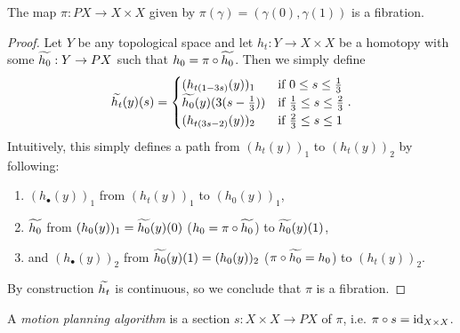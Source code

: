 \begin{remark}
    The map $\pi : PX \to X \times X$ given by $\pi(\gamma) = (\gamma(0), \gamma(1))$ is a fibration.
    \begin{proof}
        Let $Y$ be any topological space and let $h_t : Y \to X \times X$ be a homotopy with some $\Tilde{h_0} : Y \to PX$ such that $h_0 = \pi \circ \Tilde{h_0}$.
        Then we simply define
        \[
            \Tilde{h_t}(y)(s) =
            \begin{cases}
                (h_{t(1-3s)}(y))_1           &\text{if } 0 \leq s \leq \f13 \\
                \Tilde{h_0}(y)(3(s - \f{1}{3}))   &\text{if } \f13 \leq s \leq \f23 \\
                (h_{t(3s-2)}(y))_2           &\text{if } \f23 \leq s \leq 1
            \end{cases}.
        \]
        Intuitively, this simply defines a path from $(h_t(y))_1$ to $(h_t(y))_2$ by following:
        \begin{enumerate}
            \item $(h_\bullet(y))_1$ from $(h_t(y))_1$ to $(h_0(y))_1$,
            \item $\Tilde{h_0}$ from $(h_0(y))_1 = \Tilde{h_0}(y)(0)$ ($h_0 = \pi \circ \Tilde{h_0}$) to $\Tilde{h_0}(y)(1)$,
            \item and $(h_\bullet(y))_2$ from $\Tilde{h_0}(y)(1) = (h_0(y))_2$ ($\pi \circ \Tilde{h_0} = h_0$) to $(h_t(y))_2$.
        \end{enumerate}
        By construction $\Tilde{h_t}$ is continuous, so we conclude that $\pi$ is a fibration.
    \end{proof}
\end{remark}

\begin{definition}
    A \emph{motion planning algorithm} is a section $s : X \times X \to PX$ of $\pi$, i.e. $\pi \circ s = \id_{X \times X}$.
\end{definition}



